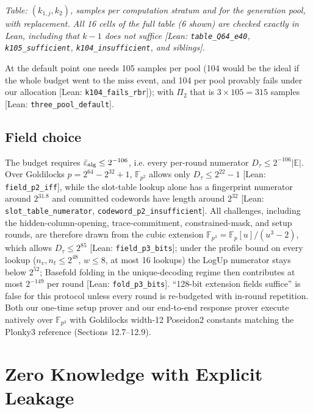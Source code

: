 \documentclass[10pt]{article}
\begin{document}
\emph{Table: $(k_{1,j},k_2)$, samples per computation stratum and for the generation pool, with replacement. All 16 cells of the full table (6 shown) are checked exactly in Lean, including that $k-1$ does not suffice [Lean: \texttt{table\_\allowbreak{}Q64\_\allowbreak{}e40}, \texttt{k105\_\allowbreak{}sufficient}, \texttt{k104\_\allowbreak{}insufficient}, and siblings].}

At the default point one needs 105 samples per pool (104 would be the ideal if the whole budget went to the miss event, and 104 per pool provably fails under our allocation [Lean: \texttt{k104\_\allowbreak{}fails\_\allowbreak{}rbr}]); with $\Pi_2$ that is $3\times105=315$ samples [Lean: \texttt{three\_\allowbreak{}pool\_\allowbreak{}default}].

\subsection{Field choice}
The budget requires $\bar\varepsilon_{\rm alg}\le2^{-106}$, i.e. every per-round numerator $D_\tau\le2^{-106}\lvert\mathbb E\rvert$. Over Goldilocks $p=2^{64}-2^{32}+1$, $\mathbb F_{p^2}$ allows only $D_\tau\le2^{22}-1$ [Lean: \texttt{field\_\allowbreak{}p2\_\allowbreak{}iff}], while the slot-table lookup alone has a fingerprint numerator around $2^{31.8}$ and committed codewords have length around $2^{32}$ [Lean: \texttt{slot\_\allowbreak{}table\_\allowbreak{}numerator}, \texttt{codeword\_\allowbreak{}p2\_\allowbreak{}insufficient}]. All challenges, including the hidden-column-opening, trace-commitment, constrained-mask, and setup rounds, are therefore drawn from the cubic extension $\mathbb F_{p^3}=\mathbb F_p[u]/(u^3-2)$, which allows $D_\tau\le2^{85}$ [Lean: \texttt{field\_\allowbreak{}p3\_\allowbreak{}bits}]; under the profile bound on every lookup ($n_v,n_t\le2^{48}$, $w\le8$, at most 16 lookups) the LogUp numerator stays below $2^{52}$; Basefold folding in the unique-decoding regime then contributes at most $2^{-149}$ per round [Lean: \texttt{fold\_\allowbreak{}p3\_\allowbreak{}bits}]. ``128-bit extension fields suffice'' is false for this protocol unless every round is re-budgeted with in-round repetition. Both our one-time setup prover and our end-to-end response prover execute natively over $\mathbb F_{p^3}$ with Goldilocks width-12 Poseidon2 constants matching the Plonky3 reference (Sections 12.7--12.9).

\section{Zero Knowledge with Explicit Leakage}
\end{document}
